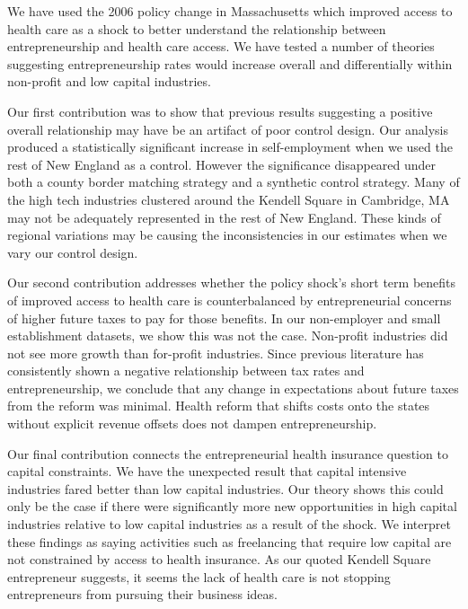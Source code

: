 \documentclass[12pt]{article}
\begin{document}
We have used the 2006 policy change in Massachusetts which improved access to health care as a shock to better understand the relationship between entrepreneurship and health care access. We have tested a number of theories suggesting entrepreneurship rates would increase overall and differentially within non-profit and low capital industries. 

Our first contribution was to show that previous results suggesting a positive overall relationship may have be an artifact of poor control design. Our analysis produced a statistically significant increase in self-employment when we used the rest of New England as a control. However the significance disappeared under both a county border matching strategy and a synthetic control strategy. Many of the high tech industries clustered around the Kendell Square in Cambridge, MA may not be adequately represented in the rest of New England. These kinds of regional variations may be causing the inconsistencies in our estimates when we vary our control design. 

Our second contribution addresses whether the policy shock's short term benefits of improved access to health care is counterbalanced by entrepreneurial concerns of higher future taxes to pay for those benefits. In our non-employer and small establishment datasets, we show this was not the case. Non-profit industries did not see more growth than for-profit industries. Since previous literature  has consistently shown a negative relationship between tax rates and entrepreneurship, we conclude that any change in expectations about future taxes from the reform was minimal. Health reform that shifts costs onto the states without explicit revenue offsets does not dampen entrepreneurship.  

Our final contribution connects the entrepreneurial health insurance question to capital constraints. We have the unexpected result that capital intensive industries fared better than low capital industries. Our theory shows this could only be the case if there were significantly more new opportunities in high capital industries relative to low capital industries as a result of the shock. We interpret these findings as saying activities such as freelancing that require low capital are not constrained by access to health insurance. As our quoted Kendell Square entrepreneur suggests, it seems the lack of health care is not stopping entrepreneurs from pursuing their business ideas. 
\end{document}
